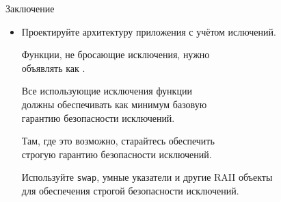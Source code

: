 \documentclass[aspectration=1610,t]{beamer}
\begin{document}
\begin{frame}[fragile]{Заключение}
    \begin{itemize}
        \item Проектируйте архитектуру приложения с учётом ислючений.
        
        \pitem Функции, не бросающие исключения, нужно \\объявлять
        как .
        
        \pitem Все использующие исключения функции \\должны
        обеспечивать как минимум базовую \\гарантию безопасности исключений.
        
        \pitem Там, где это возможно, старайтесь обеспечить\\
        строгую гарантию безопасности исключений.
        
        \pitem Используйте \texttt{swap}, умные указатели и другие
        RAII объекты\\ для обеспечения строгой безопасности исключений.
    \end{itemize}
\end{frame}
\end{document}
